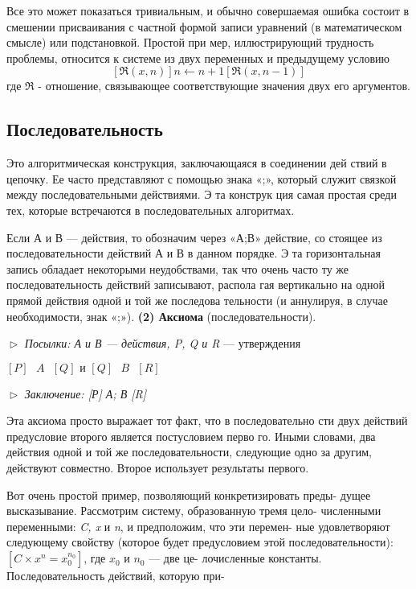Все  это  может  показаться  тривиальным,  и  обычно  совершаемая 
ошибка  состоит  в  смешении  присваивания с  частной  формой  записи 
уравнений (в математическом смысле)  или подстановкой. Простой при­
мер,  иллюстрирующий  трудность  проблемы,  относится  к  системе  из 
двух переменных  и  предыдущему  условию
\begin{equation*}
\textit{$[\Re(x,n)] n \leftarrow n + 1 [\Re(x,n - 1)]$}
	\end{equation*}
где $\Re$ - отношение,  связывающее соответствующие значения двух его 
аргументов.
\subsection{Последовательность}
\noindent Это  алгоритмическая конструкция,  заключающаяся  в соединении  дей­
ствий  в цепочку.  Ее часто представляют с помощью знака «;», который 
служит связкой  между  последовательными  действиями.  Э та конструк­
ция самая простая среди тех, которые встречаются в последовательных 
алгоритмах.

Если А и В — действия,  то обозначим  через  «А;В» действие, со­
стоящее из последовательности действий А и В в данном порядке. Э та 
горизонтальная запись обладает некоторыми неудобствами, так что 
очень часто ту же последовательность действий записывают, распола­
гая вертикально на одной прямой действия одной и той же последова­
тельности (и аннулируя, в случае необходимости, знак «;»).
\newline
\textbf{(2) Аксиома} (последовательности).
\newline

\noindent $\vartriangleright$ \textit{Посылки: А и В --- действия, P, Q и R} --- утверждения
\begin{center}
\textit{$[ P ]\textit{ }A\textit{ }[ Q ]  \text{ и } [Q]\textit{ }B\textit{ }[ R ]$}
\end{center}
\pagebreak
$\vartriangleright$ \textit{Заключение:  [Р] А; В [R]}
\newline

Эта  аксиома  просто  выражает  тот  факт,  что  в  последовательно­
сти двух действий  предусловие  второго является  постусловием  перво­
го. Иными словами, два действия одной и той же последовательности, 
следующие  одно за другим,  действуют  совместно.  Второе  использует 
результаты первого.

Вот очень простой пример, позволяющий конкретизировать преды-\linebreak
дущее  высказывание.  Рассмотрим систему,  образованную тремя цело­-\linebreak
численными переменными: \textit{C, x} и \textit{n}, и предположим, что эти перемен­-\linebreak
ные удовлетворяют следующему свойству (которое будет предусловием \linebreak
этой последовательности):\textit{$[C\times x^{n} = x_{0}^{n_{0}}]$}, где \textit{$x_{0}$} и \textit{$n_{0}$} --- две це-\linebreak
лочисленные константы. Последовательность действий, которую при­-

